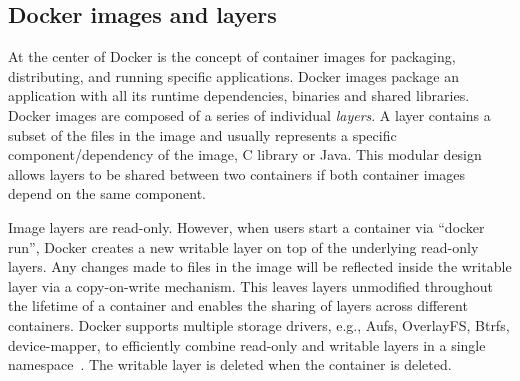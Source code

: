 
\subsection{Docker images and layers}
\label{sec-image-layers}

At the center of Docker is the concept of container images for packaging,
distributing, and running specific applications.
%
%
%
Docker images package an application with all its runtime dependencies, \eg
binaries and shared libraries.
Docker images are composed of a series of individual \emph{layers}.
A layer contains a subset of the files in the image and 
usually represents a specific component/dependency of the image, \eg C library or
Java. This modular design allows layers to be shared between two containers if both
container images depend on the same component. 


Image layers are read-only. However, when users start a
container via ``docker run'', Docker creates a new writable layer on top of the
underlying read-only layers. Any changes made to files in the image will be
reflected inside the writable layer via a copy-on-write mechanism. This leaves layers
unmodified throughout the lifetime of a container and enables the sharing of
layers across different containers.
Docker supports multiple storage drivers, e.g., Aufs, OverlayFS, Btrfs,
device-mapper, to efficiently combine read-only and writable layers
in a single namespace~\cite{docker-driver-eval}.
The writable layer is deleted when the container is deleted.
 


